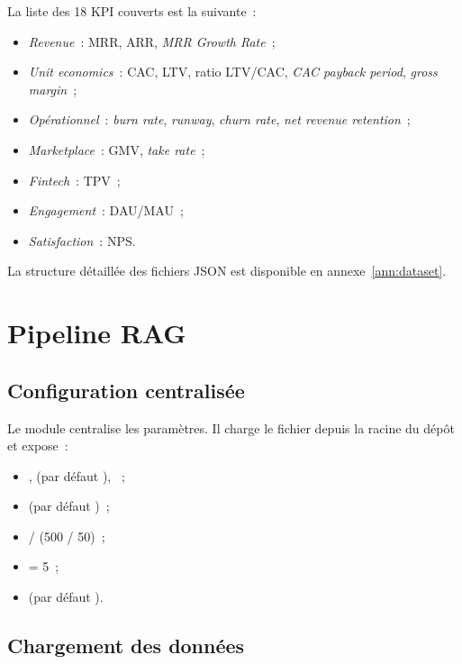 La liste des 18 \ac{KPI} couverts est la suivante~:

\begin{itemize}
  \item \textit{Revenue}~: \ac{MRR}, \ac{ARR}, \textit{MRR Growth Rate}~;
  \item \textit{Unit economics}~: \ac{CAC}, \ac{LTV}, ratio LTV/CAC, \textit{CAC payback period}, \textit{gross margin}~;
  \item \textit{Opérationnel}~: \textit{burn rate}, \textit{runway}, \textit{churn rate}, \textit{net revenue retention}~;
  \item \textit{Marketplace}~: \ac{GMV}, \textit{take rate}~;
  \item \textit{Fintech}~: \ac{TPV}~;
  \item \textit{Engagement}~: \ac{DAU}/\ac{MAU}~;
  \item \textit{Satisfaction}~: \ac{NPS}.
\end{itemize}

La structure détaillée des fichiers \ac{JSON} est disponible en annexe~\ref{ann:dataset}.

\section{Pipeline RAG}

\subsection{Configuration centralisée}

Le module  centralise les paramètres. Il charge le fichier  depuis la racine du dépôt et expose~:

\begin{itemize}
  \item {},  (par défaut ), ~;
  \item {} (par défaut )~;
  \item {} /  (500 / 50)~;
  \item {} = 5~;
  \item {} (par défaut ).
\end{itemize}

\subsection{Chargement des données}

